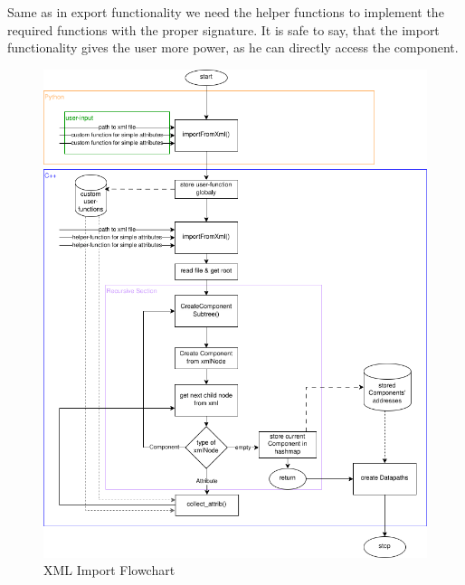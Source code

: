 Same as in export functionality we need the helper functions to implement the required functions with the proper signature. It is safe to say, that the import functionality gives the user more power, as he can directly access the component. 

\begin{figure}[htpb]
    \centering
    \includegraphics[width=\textwidth]{figures/XML_import-flowchart.png}
    \caption{XML Import Flowchart}
    \label{fig:xml-import}
\end{figure}

